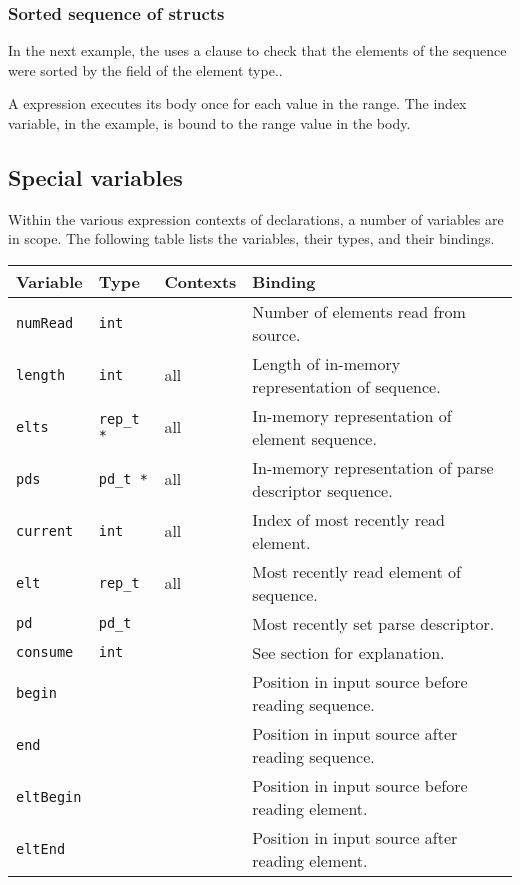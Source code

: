 \subsubsection{Sorted sequence of structs}
In the next example, the \Parray{}  uses a \Pwhere{}
clause to check that the elements of the sequence were sorted by the
 field of the element type..

%
\noindent
A \Pforall{} expression executes its body once for each value in the
range. The index variable,  in the example, is bound to the
range value in the body.

\subsection{Special variables}
\label{sec:special-variables}
Within the various expression contexts of \Parray{} declarations, a
number of variables are in scope.  The following table lists the
variables, their types, and their bindings.

\myvskip{1ex}
\begin{center}
\begin{tabular}{|l|l|l|l|}
\hline
Variable & Type & Contexts & Binding \\\hline \hline
\texttt{numRead}  & \texttt{int}     & \Pparsecheck{} & Number of elements read from source. \\ \hline
\texttt{length}   & \texttt{int}     & all & Length of in-memory representation of sequence.\\ \hline
\texttt{elts}     & \texttt{rep\_t *}& all & In-memory representation of element sequence. \\ \hline
\texttt{pds}      & \texttt{pd\_t *} & all & In-memory representation of parse descriptor sequence. \\ \hline
\texttt{current}  & \texttt{int}     & all & Index of most recently read element.  \\ \hline
\texttt{elt}      & \texttt{rep\_t}  & all & Most recently read element of sequence. \\ \hline
\texttt{pd}       & \texttt{pd\_t}   & \Pparsecheck{} & Most recently set  parse descriptor. \\ \hline
\texttt{consume}  & \texttt{int}     & \Pended{} & See \Pended{} section for explanation. \\ \hline
\texttt{begin}    & \Ppost{}         & \Pparsecheck{} & Position in input source before reading sequence. \\ \hline
\texttt{end}      & \Ppost{}         & \Pparsecheck{} & Position in input source after reading sequence. \\ \hline
\texttt{eltBegin}& \Ppost{}         & \Pparsecheck{} & Position in input source before reading element. \\ \hline
\texttt{eltEnd}  & \Ppost{}         & \Pparsecheck{} & Position in input source after reading element. \\ \hline
\end{tabular}
\end{center}
\myvskip{1ex}

